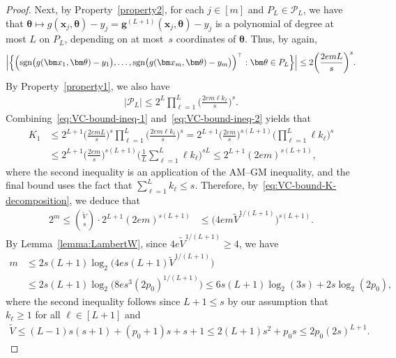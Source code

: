 \documentclass[12pt]{article}
\def\tilde{\widetilde}
\begin{document}
\begin{proof}
    Next, by Property~\ref{property2}, for each $j\in[m]$ and $P_{L} \in \mathcal{P}_L$, we have that $\bm \theta \mapsto g(\bm x_j,\bm \theta) - y_j = \bm g^{(L+1)}(\bm x_j,\bm \theta) - y_j$ is a polynomial of degree at most $L$ on $P_L$, depending on at most~$s$ coordinates of $\bm \theta$. Thus, by \citet[Lemma~17]{bartlett2019nearly} again,
    \begin{align}
        \Bigl| \Bigl\{ \Bigl(\mathrm{sgn}\bigl(g(\bm x_1,\bm \theta) - y_1\bigr), \ldots, \mathrm{sgn}\bigl(g(\bm x_m,\bm \theta) - y_m\bigr)\Bigr)^\top : \bm \theta\in P_L \Bigr\} \Bigr| \leq 2\biggl( \frac{2emL}{s} \biggr)^{s}. \label{eq:VC-bound-ineq-1}
    \end{align}
    By Property~\ref{property1}, we also have 
    \begin{align}
        |\mathcal{P}_L| \leq 2^L\prod_{\ell=1}^L \biggl( \frac{2em\ell k_{\ell}}{s} \biggr)^s. \label{eq:VC-bound-ineq-2}
    \end{align}
    Combining~\eqref{eq:VC-bound-ineq-1} and~\eqref{eq:VC-bound-ineq-2} yields that
    \begin{align*}
        K_1 &\leq 2^{L+1}\biggl( \frac{2emL}{s} \biggr)^{s} \prod_{\ell=1}^{L} \biggl( \frac{2em \ell k_{\ell}}{s} \biggr)^s = 2^{L+1} \biggl( \frac{2em}{s} \biggr)^{s(L+1)} \biggl(\prod_{\ell=1}^L \ell k_\ell\biggr)^s\\
        &\leq 2^{L+1} \biggl( \frac{2em}{s} \biggr)^{s(L+1)} \biggl(\frac{1}{L}\sum_{\ell=1}^L \ell k_\ell\biggr)^{sL}\leq 2^{L+1} (2em)^{s(L+1)},
    \end{align*}
    where the second inequality is an application of the AM--GM inequality, and the final bound uses the fact that $\sum_{\ell=1}^L k_\ell \leq s$.  Therefore, by~\eqref{eq:VC-bound-K-decomposition}, we deduce that
    \begin{align*}
        2^m \leq \binom{\tilde{V}}{s} \cdot 2^{L+1} (2em)^{s(L+1)} &\leq  \bigl( 4em \tilde{V}^{1/(L+1)}\bigr)^{s(L+1)}. 
    \end{align*}
    By Lemma~\ref{lemma:LambertW}, since $4e\tilde{V}^{1/(L+1)} \geq 4$, we have
    \begin{align*}
        m &\leq 2s(L+1)\log_2\bigl(4es(L+1)\tilde{V}^{1/(L+1)}\bigr) \\
        &\leq 2s(L+1)\log_2\bigl(8es^3(2p_0)^{1/(L+1)}\bigr) \leq 6s(L+1)\log_2(3s) + 2s\log_2(2p_0),
    \end{align*}
    where the second inequality follows since $L+1 \leq s$ by our assumption that $k_\ell \geq 1$ for all $\ell\in[L+1]$ and
    \begin{align*}
        \tilde{V} \leq (L-1)s(s+1) + (p_0+1)s + s + 1 \leq 2(L+1)s^2 + p_0s \leq 2p_0(2s)^{L+1}.
    \end{align*}



\end{proof}
\end{document}
